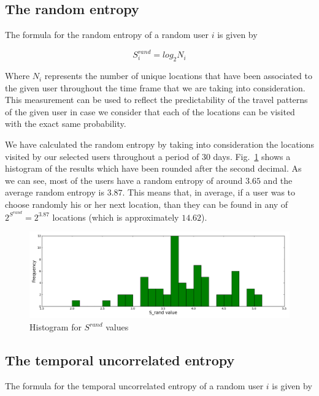 \subsection{The random entropy}
\label{r_e}

The formula for the random entropy of a random user $i$ is given by

\begin{equation}
S_{i}^{rand} = log_{2}N_{i}
\end{equation}

Where $N_{i}$ represents the number of unique locations that have been
associated to the given user throughout the time frame that we are taking into
consideration. This measurement can be used to reflect the predictability of the
travel patterns of the given user in case we consider that each of the locations
can be visited with the exact same probability.

We have calculated the random entropy by taking into consideration the locations
visited by our selected users throughout a period of $30$ days.
Fig.~\ref{dis_r_e} shows a histogram of the results which have been rounded
after the second decimal. As we can see, most of the users have a random entropy
of around $3.65$ and the average random entropy is $3.87$. This means that, in
average, if a user was to choose randomly his or her next location, than they
can be found in any of $2^{S^{rand}} = 2^{3.87}$ locations (which is
approximately $14.62$).

\begin{figure}[!h]
\centering
\includegraphics[width=\textwidth]{figures/entro_pred/rand_entro_distrib.png}
\caption{Histogram for $S^{rand}$ values}
\label{dis_r_e}
\end{figure}

\subsection{The temporal uncorrelated entropy}
\label{tu_e}

The formula for the temporal uncorrelated entropy of a random user $i$ is given
by

